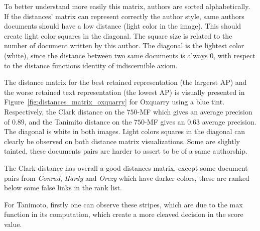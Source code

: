 To better understand more easily this matrix, authors are sorted alphabetically.
If the distances' matrix can represent correctly the author style, same authors documents should have a low distance (light color in the image).
This should create light color squares in the diagonal.
The square size is related to the number of document written by this author.
The diagonal is the lightest color (white), since the distance between two same documents is always 0, with respect to the distance functions identity of indiscernible axiom.

The distance matrix for the best retained representation (the largerst AP) and the worse retained text representation (the lowest AP) is visually presented in Figure~\ref{fig:distances_matrix_oxquarry} for Oxquarry using a blue tint.
Respectively, the Clark distance on the $750$-MF which gives an average precision of $0.89$, and the Tanimito distance on the $750$-MF gives an $0.63$ average precision.
The diagonal is white in both images.
Light colors squares in the diagonal can clearly be observed on both distance matrix visualizations.
Some are slightly tainted, these documents pairs are harder to assert to be of a same authorship.

The Clark distance has overall a good distances matrix, except some document pairs from \textit{Conrad}, \textit{Hardy} and \textit{Orczy} which have darker colors, these are ranked below some false links in the rank list.

For Tanimoto, firstly one can observe these stripes, which are due to the max function in its computation, which create a more cleaved decision in the score value.

